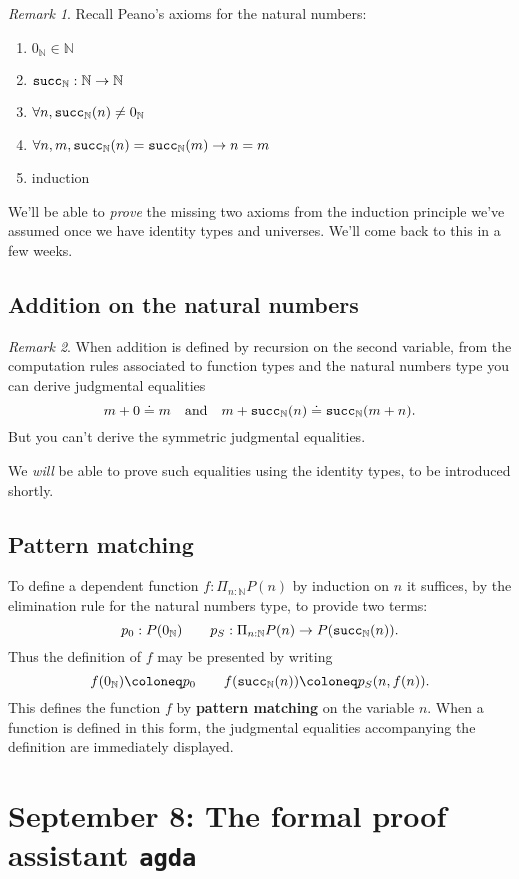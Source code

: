 \documentclass{amsart}
\theoremstyle{theorem}
\theoremstyle{definition}
\theoremstyle{remark}
\newtheorem*{rmk}{Remark}
\newcommand{\0}{\mathbbe{0}}
\newcommand{\1}{\mathbbe{1}}
\newcommand{\2}{\mathbbe{2}}
\newcommand{\3}{\mathbbe{3}}
\newcommand{\4}{\mathbbe{4}}
\newcommand{\term}[1]{{\textup{\texttt{#1}}}}
\newcommand{\bN}{{\mathbb{N}}}
\newcommand{\suc}{\term{succ}_{\bN}}
\begin{document}
\begin{rmk} Recall Peano's axioms for the natural numbers: 
\begin{enumerate}
\item $0_\bN \in \bN$
\item $\suc : \bN \to \bN$
\item $\forall n, \suc(n) \neq 0_\bN$
\item $\forall n,m, \suc(n)= \suc(m) \to n=m$
\item induction
\end{enumerate}
We'll be able to \emph{prove} the missing two axioms from the induction principle we've assumed once we have identity types and universes. We'll come back to this in a few weeks.
\end{rmk}

\subsection*{Addition on the natural numbers}

\begin{rmk} When addition is defined by recursion on the second variable, from the computation rules associated to function types and the natural numbers type you can derive judgmental equalities \[
m + 0 \doteq m \quad \text{and} \quad m + \suc(n) \doteq \suc(m + n).
\]
But you can't derive the symmetric judgmental equalities.
\end{rmk}

We \emph{will} be able to prove such equalities using the identity types, to be introduced shortly.

\subsection*{Pattern matching}

To define a dependent function $f : \Pi_{n : \bN} P(n)$ by induction on $n$ it suffices, by the elimination rule for the natural numbers type, to provide two terms:
\[ p_0 : P(0_\bN) \qquad p_S : \Pi_{n : \bN} P(n) \to P(\suc(n)).\]
Thus the definition of $f$ may be presented by writing
\[ f(0_\bN) \coloneq p_0 \qquad f(\suc(n)) \coloneq p_S(n,f(n)).\]
This defines the function $f$ by \textbf{pattern matching} on the variable $n$. When a function is defined in this form, the judgmental equalities accompanying the definition are immediately displayed.

\section*{September 8: The formal proof assistant \texttt{agda}}
\end{document}

